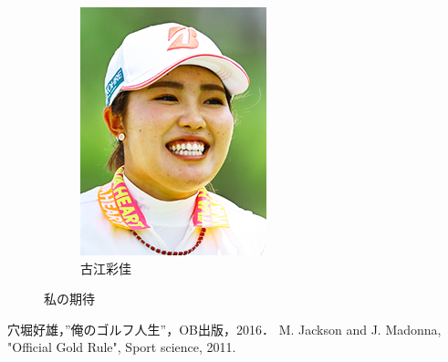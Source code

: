 \documentclass[a4j, twocolumn]{jarticle}
\begin{document}
\begin{figure}[htb]
\begin{subfigure}[b]{0.12\textwidth}
        \includegraphics[height=\textwidth]{furue.jpg}
        \vspace{-1.0mm}
        \caption{古江彩佳}
        \label{furueimg}
    \end{subfigure}
        \vspace{-3.0mm}
        \caption{私の期待}
       \label{jpnimg}
\end{figure}

\vspace{-20pt}

\begin{thebibliography}{99}
    穴堀好雄，”俺のゴルフ人生”，OB出版，2016．
    M. Jackson and J. Madonna, "Official Gold Rule", Sport science, 2011.
\end{thebibliography}
\end{document}
